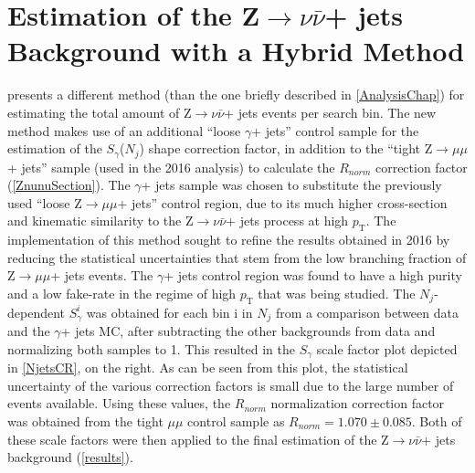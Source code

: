 \section{Estimation of the Z$\rightarrow \nu\bar{\nu}$+ jets Background with a Hybrid Method}

 presents a different method (than the one briefly described in \autoref{AnalysisChap}) for estimating the total amount of Z$\rightarrow \nu\bar{\nu}$+ jets events per search bin. The new method makes use of an additional ``loose $\gamma$+ jets'' control sample for the estimation of the $S_\gamma$($N_j$) shape correction factor, in addition to the ``tight Z$\rightarrow\mu\mu$+ jets'' sample (used in the 2016 analysis) to calculate the $R_{norm}$ correction factor (\autoref{ZnunuSection}). The $\gamma$+ jets sample was chosen to substitute the previously used ``loose Z$\rightarrow\mu\mu$+ jets'' control region, due to its much higher cross-section and kinematic similarity to the Z$\rightarrow \nu\bar{\nu}$+ jets process at high $p_\text{T}$. The implementation of this method sought to refine the results obtained in 2016 by reducing the statistical uncertainties that stem from the low branching fraction of Z$\rightarrow\mu\mu$+ jets events. The $\gamma$+ jets control region was found to have a high purity and a low fake-rate in the regime of high $p_\text{T}$ that was being studied. The $N_j$-dependent $S_\gamma^{i}$ was obtained for each bin i in $N_j$ from a comparison between data and the $\gamma$+ jets MC, after subtracting the other backgrounds from data and normalizing both samples to 1. This resulted in the $S_\gamma$ scale factor plot depicted in \autoref{NjetsCR}, on the right. As can be seen from this plot, the statistical uncertainty of the various correction factors is small due to the large number of events available. Using these values, the $R_{norm}$ normalization correction factor was obtained from the tight $\mu\mu$ control sample as $R_{norm} = 1.070 \pm 0.085$. Both of these scale factors were then applied to the final estimation of the Z$\rightarrow \nu\bar{\nu}$+ jets background (\autoref{results}). 
